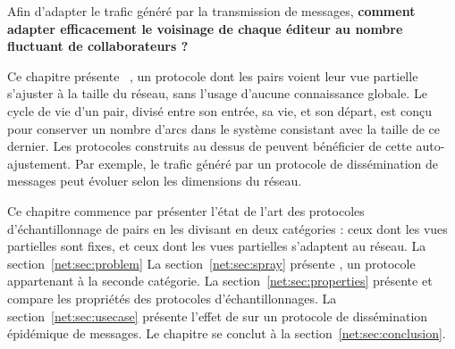 

Afin d'adapter le trafic généré par la transmission de messages, \textbf{comment
  adapter efficacement le voisinage de chaque éditeur au nombre fluctuant de
  collaborateurs ?}

Ce chapitre présente \SPRAY~\cite{nedelec2015spray}, un protocole dont les pairs
voient leur vue partielle s'ajuster à la taille du réseau, sans l'usage d'aucune
connaissance globale. Le cycle de vie d'un pair, divisé entre son entrée, sa
vie, et son départ, est conçu pour conserver un nombre d'arcs dans le système
consistant avec la taille de ce dernier. Les protocoles construits au dessus de
\SPRAY peuvent bénéficier de cette auto-ajustement. Par exemple, le trafic
généré par un protocole de dissémination de messages peut évoluer selon les
dimensions du réseau.

Ce chapitre commence par présenter l'état de l'art des protocoles
d'échantillonnage de pairs en les divisant en deux catégories : ceux dont les
vues partielles sont fixes, et ceux dont les vues partielles s'adaptent au
réseau. La section~\ref{net:sec:problem} La section~\ref{net:sec:spray} présente
\SPRAY, un protocole appartenant à la seconde catégorie. La
section~\ref{net:sec:properties} présente et compare les propriétés des
protocoles d'échantillonnages. La section~\ref{net:sec:usecase} présente l'effet
de \SPRAY sur un protocole de dissémination épidémique de messages. Le chapitre
se conclut à la section~\ref{net:sec:conclusion}.


